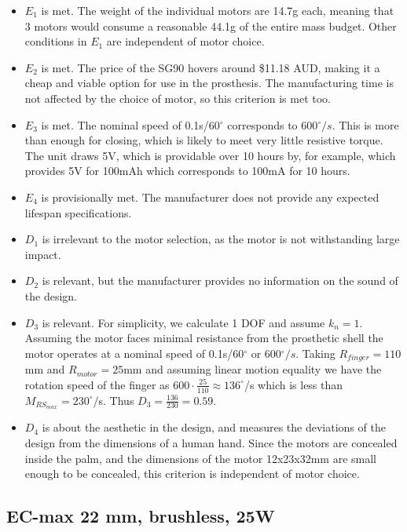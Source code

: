 \documentclass[12pt,3p]{report}
\begin{document}
\begin{multicols}{2}
		\begin{itemize}
		    \item[\checkmark] $E_1$ is met. The weight of the individual motors are 14.7g each, meaning that 3 motors would consume a reasonable 44.1g of the entire mass budget. Other conditions in $E_1$ are independent of motor choice.
		    \item[\checkmark] $E_2$ is met. The price of the SG90 hovers around \$11.18 AUD, making it a cheap and viable option for use in the prosthesis. The manufacturing time is not affected by the choice of motor, so this criterion is met too.
		    \item[\checkmark] $E_3$ is met. The nominal speed of 0.1s/60$^{\circ}$ corresponds to 600$^{\circ}/s$. This is more than enough for closing, which is likely to meet very little resistive torque. The unit draws 5V, which is providable over 10 hours by, for example, \cite{coreelectronics} which provides 5V for 100mAh which corresponds to 100mA for 10 hours. 
		    \item[\checkmark] $E_4$ is provisionally met. The manufacturer does not provide any expected lifespan specifications.
		    \item $D_1$ is irrelevant to the motor selection, as the motor is not withstanding large impact.
		    \item $D_2$ is relevant, but the manufacturer provides no information on the sound of the design.
			\item $D_3$ is relevant. For simplicity, we calculate 1 DOF and assume $k_n = 1$. Assuming the motor faces minimal resistance from the prosthetic shell the motor operates at a nominal speed of 0.1s/60$^{\circ}$ or 600$^{\circ}/s$. Taking $R_{finger} = 110$mm and $R_{motor} = 25$mm and assuming linear motion equality we have the rotation speed of the finger as $600\cdot\frac{25}{110} \approx 136^\circ$/s which is less than $M_{RS_{max}}= 230^\circ$/s. Thus $D_3 = \frac{136}{230} = 0.59$.
		    \item $D_4$ is about the aesthetic in the design, and measures the deviations of the design from the dimensions of a
		    human hand. Since the motors are concealed inside the palm, and the dimensions of the motor 12x23x32mm are small enough to be concealed, this criterion is independent of motor choice.

		\end{itemize}
	
		\subsection{EC-max 22 mm, brushless, 25W}
		

\end{multicols}
\end{document}
